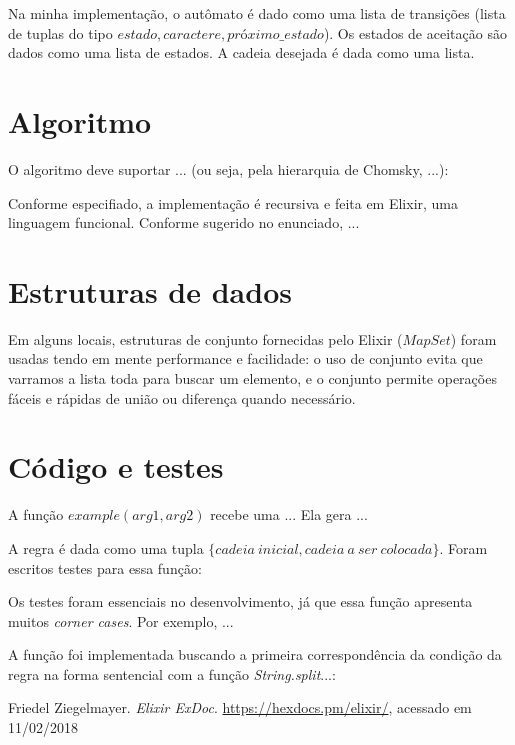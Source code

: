 \documentclass[conference]{IEEEtran}
\begin{document}
Na minha implementação, o autômato é dado como uma lista de transições (lista de tuplas do tipo ${estado, caractere, próximo\_estado}$). Os estados de aceitação são dados como uma lista de estados. A cadeia desejada é dada como uma lista.

\section{Algoritmo}

O algoritmo deve suportar ... (ou seja, pela hierarquia de Chomsky, ...):

Conforme especifiado, a implementação é recursiva e feita em Elixir, uma linguagem funcional. Conforme sugerido no enunciado, ...

\section{Estruturas de dados}

Em alguns locais, estruturas de conjunto fornecidas pelo Elixir ($MapSet$) foram usadas tendo em mente performance e facilidade: o uso de conjunto evita que varramos a lista toda para buscar um elemento, e o conjunto permite operações fáceis e rápidas de união ou diferença quando necessário.

\section{Código e testes}

A função $example(arg1, arg2)$ recebe uma ... Ela gera ...

A regra é dada como uma tupla $\{cadeia\ inicial, cadeia\ a\ ser\ colocada\}$. Foram escritos testes para essa função:

% 

Os testes foram essenciais no desenvolvimento, já que essa função apresenta muitos \emph{corner cases}. Por exemplo, ...

A função foi implementada buscando a primeira correspondência da condição da regra na forma sentencial com a função \emph{String.split}...:

% 

\begin{thebibliography}{1}
Friedel Ziegelmayer. \emph{Elixir ExDoc}. \url{https://hexdocs.pm/elixir/}, acessado em 11/02/2018
\end{thebibliography}
\end{document}
